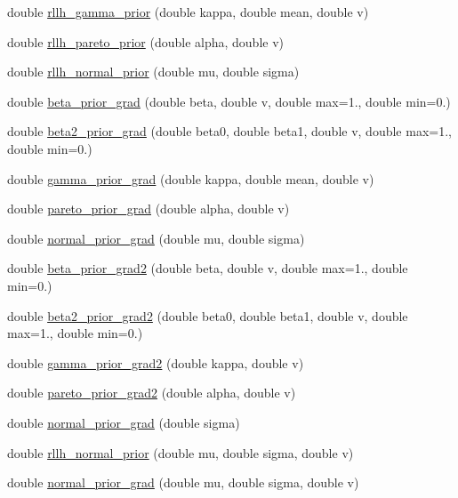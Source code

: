 \begin{DoxyCompactItemize}
\item 
double \hyperlink{namespacemappel_ac76807de851d24f1b720629ad9062cb2}{rllh\+\_\+gamma\+\_\+prior} (double kappa, double mean, double v)
\item 
double \hyperlink{namespacemappel_a2a07cb3a2c6ccd588241807747f3bd56}{rllh\+\_\+pareto\+\_\+prior} (double alpha, double v)
\item 
double \hyperlink{namespacemappel_a83c043a3c96a38aff92e40445f1ffd7a}{rllh\+\_\+normal\+\_\+prior} (double mu, double sigma)
\item 
double \hyperlink{namespacemappel_a077bd23f694399652e8e3a3be5758688}{beta\+\_\+prior\+\_\+grad} (double beta, double v, double max=1., double min=0.)
\item 
double \hyperlink{namespacemappel_a2b820140eb5c93d7d256a30fc6137ef8}{beta2\+\_\+prior\+\_\+grad} (double beta0, double beta1, double v, double max=1., double min=0.)
\item 
double \hyperlink{namespacemappel_a0f4c641d9784a4688faa26c126e28fa2}{gamma\+\_\+prior\+\_\+grad} (double kappa, double mean, double v)
\item 
double \hyperlink{namespacemappel_a39593a3b69416194cd751ce9d14c6ac3}{pareto\+\_\+prior\+\_\+grad} (double alpha, double v)
\item 
double \hyperlink{namespacemappel_a4cf075a8296209b3ad86ea5b0e1f69b3}{normal\+\_\+prior\+\_\+grad} (double mu, double sigma)
\item 
double \hyperlink{namespacemappel_a6a36b8a34be04643747e178a8358251c}{beta\+\_\+prior\+\_\+grad2} (double beta, double v, double max=1., double min=0.)
\item 
double \hyperlink{namespacemappel_af516b8782a35f0983f0184d8d907df5e}{beta2\+\_\+prior\+\_\+grad2} (double beta0, double beta1, double v, double max=1., double min=0.)
\item 
double \hyperlink{namespacemappel_a09f684e270fef9279b5eabff96e54edb}{gamma\+\_\+prior\+\_\+grad2} (double kappa, double v)
\item 
double \hyperlink{namespacemappel_ada81641eef9ad6a8741e8919ad5c13b9}{pareto\+\_\+prior\+\_\+grad2} (double alpha, double v)
\item 
double \hyperlink{namespacemappel_ab4d747ffc0e3113c61dc115210c4225f}{normal\+\_\+prior\+\_\+grad} (double sigma)
\item 
double \hyperlink{namespacemappel_acf463f0ab903ab18560ce6c1a94be694}{rllh\+\_\+normal\+\_\+prior} (double mu, double sigma, double v)
\item 
double \hyperlink{namespacemappel_a217d463069e4893cbae3574a7b91e68b}{normal\+\_\+prior\+\_\+grad} (double mu, double sigma, double v)

\end{DoxyCompactItemize}
